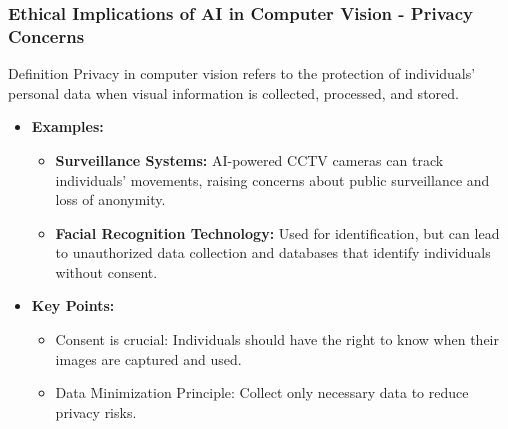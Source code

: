 \documentclass[aspectratio=169]{beamer}
\begin{document}
\begin{frame}[fragile]
    \frametitle{Ethical Implications of AI in Computer Vision - Privacy Concerns}
    \begin{block}{Definition}
        Privacy in computer vision refers to the protection of individuals' personal data when visual information is collected, processed, and stored.
    \end{block}
    
    \begin{itemize}
        \item \textbf{Examples:}
        \begin{itemize}
            \item \textbf{Surveillance Systems:} AI-powered CCTV cameras can track individuals’ movements, raising concerns about public surveillance and loss of anonymity.
            \item \textbf{Facial Recognition Technology:} Used for identification, but can lead to unauthorized data collection and databases that identify individuals without consent.
        \end{itemize}
        \item \textbf{Key Points:}
        \begin{itemize}
            \item Consent is crucial: Individuals should have the right to know when their images are captured and used.
            \item Data Minimization Principle: Collect only necessary data to reduce privacy risks.
        \end{itemize}
    \end{itemize}
\end{frame}
\end{document}
